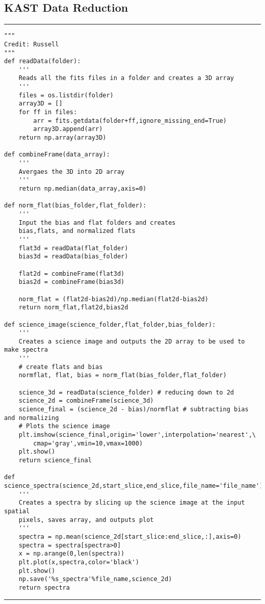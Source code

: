 \documentclass[preprint]{aastex62}
\begin{document}
\subsection{KAST Data Reduction} \label{code:stats}
\small
\hrule
\begin{lstlisting}
"""
Credit: Russell
"""
def readData(folder):
    '''
    Reads all the fits files in a folder and creates a 3D array
    '''
    files = os.listdir(folder)
    array3D = []
    for ff in files:
        arr = fits.getdata(folder+ff,ignore_missing_end=True)
        array3D.append(arr)
    return np.array(array3D)

def combineFrame(data_array):
    '''
    Avergaes the 3D into 2D array
    '''
    return np.median(data_array,axis=0)
    
def norm_flat(bias_folder,flat_folder):
    '''
    Input the bias and flat folders and creates
    bias,flats, and normalized flats
    '''
    flat3d = readData(flat_folder)
    bias3d = readData(bias_folder)

    flat2d = combineFrame(flat3d)
    bias2d = combineFrame(bias3d)

    norm_flat = (flat2d-bias2d)/np.median(flat2d-bias2d)
    return norm_flat,flat2d,bias2d

def science_image(science_folder,flat_folder,bias_folder):
    '''
    Creates a science image and outputs the 2D array to be used to make spectra
    '''
    # create flats and bias
    normflat, flat, bias = norm_flat(bias_folder,flat_folder) 

    science_3d = readData(science_folder) # reducing down to 2d 
    science_2d = combineFrame(science_3d)
    science_final = (science_2d - bias)/normflat # subtracting bias and normalizing
    # Plots the science image
    plt.imshow(science_final,origin='lower',interpolation='nearest',\
        cmap='gray',vmin=10,vmax=1000)
    plt.show()
    return science_final

def science_spectra(science_2d,start_slice,end_slice,file_name='file_name'):
    '''
    Creates a spectra by slicing up the science image at the input spatial
    pixels, saves array, and outputs plot
    '''
    spectra = np.mean(science_2d[start_slice:end_slice,:],axis=0)
    spectra = spectra[spectra>0]
    x = np.arange(0,len(spectra))
    plt.plot(x,spectra,color='black')
    plt.show()
    np.save('%s_spectra'%file_name,science_2d)
    return spectra
\end{lstlisting}
\hrule \vspace{7pt}
\end{document}
